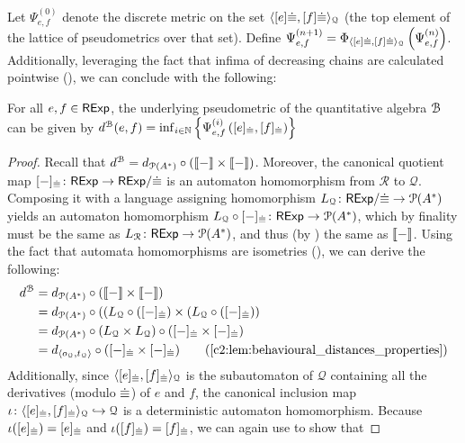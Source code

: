 Let ${\Psi}_{e,f}^{(0)}$ denote the discrete metric on the set $\langle [e]{{\mathrel{\dot\equiv}}},[f]{{\mathrel{\dot\equiv}}} \rangle_{\mathcal{Q}}$ (the top element of the lattice of pseudometrics over that set). Define ${\Psi}_{e,f}^{(n+1)} = \Phi_{\langle [e]{{\mathrel{\dot\equiv}}},[f]{{\mathrel{\dot\equiv}}} \rangle_{\mathcal{Q}}} \left({\Psi}_{e,f}^{(n)}\right)$. Additionally, leveraging the fact that infima of decreasing chains are calculated pointwise (), we can conclude with the following:
\begin{lemma}\label{c2:lem:iterative_calculation}
For all $e,f \in \mathsf{RExp}$, the underlying pseudometric of the quantitative algebra $\mathcal{B}$ can be given by $d^{\mathcal{B}}(e,f) = \inf_{i \in \mathbb{N}} \left\{ {\Psi}_{e,f}^{(i)}\left([e]_{{\mathrel{\dot\equiv}}}, [f]_{{\mathrel{\dot\equiv}}}\right)\right\} $
\end{lemma}
\begin{proof}
    Recall that $d^{\mathcal{B}} = d_{\mathcal{P}({A}^{\ast})} \circ (\left\llbracket{-}\right\rrbracket \times \left\llbracket{-}\right\rrbracket)$. Moreover, the canonical quotient map $[-]_{{\mathrel{\dot\equiv}}} \colon \mathsf{RExp} \to {\mathsf{RExp}}/{{\mathrel{\dot\equiv}}}$ is an automaton homomorphism from $\mathcal{R}$ to $\mathcal{Q}$. Composing it with a language assigning homomorphism $L_{\mathcal{Q}} \colon {\mathsf{RExp}}/{{\mathrel{\dot\equiv}}} \to \mathcal{P}({A}^\ast)$ yields an automaton homomorphism $L_{\mathcal{Q}} \circ [-]_{{\mathrel{\dot\equiv}}} \colon \mathsf{RExp} \to \mathcal{P}({A}^\ast)$, which by finality must be the same as $L_{\mathcal{R}} \colon \mathsf{RExp} \to \mathcal{P}({A}^\ast)$, and thus (by ) the same as $\left\llbracket{-}\right\rrbracket$. Using the fact that automata homomorphisms are isometries (), we can derive the following:
    \begin{align*}
    d^{\qalgB} &= \langmetric \circ (\sem{-} \times \sem{-})\\
    &= \langmetric \circ ((L_{\mathcal{Q}} \circ ([-]_{\acirel}) \times (L_{\mathcal{Q}} \circ ([-]_{\acirel}))\\
    &= \langmetric \circ (L_{\mathcal{Q}} \times L_{\mathcal{Q}}) \circ ([-]_{\acirel} \times [-]_{\acirel})\\
    &= d_{\langle o_{\mathcal{Q}}, t_{\mathcal{Q}} \rangle} \circ ([-]_{\acirel} \times [-]_{\acirel}) \tag{\Cref{c2:lem:behavioural_distances_properties}}
    \end{align*}
    Additionally, since $\langle [e]_{{\mathrel{\dot\equiv}}},[f]_{{\mathrel{\dot\equiv}}} \rangle_{\mathcal{Q}}$ is the subautomaton of $\mathcal{Q}$ containing all the derivatives (modulo ${\mathrel{\dot\equiv}}$) of $e$ and $f$, the canonical inclusion map $\iota \colon \langle [e]_{{\mathrel{\dot\equiv}}},[f]_{{\mathrel{\dot\equiv}}} \rangle_{\mathcal{Q}} \hookrightarrow \mathcal{Q}$ is a deterministic automaton homomorphism. Because $\iota([e]_{{\mathrel{\dot\equiv}}})=[e]_{{\mathrel{\dot\equiv}}}$ and $\iota([f]_{{\mathrel{\dot\equiv}}})=[f]_{{\mathrel{\dot\equiv}}}$, we can again use  to show that

\end{proof}
